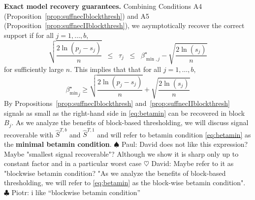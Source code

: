 \documentclass[aos]{imsart}
\theoremstyle{plain}
\newcommand{\david}[1]{{\small{\color{blue} \sf $\heartsuit$ David: #1}}}
\newcommand{\piotr}[1]{{\small{\color{red} \sf $\clubsuit$ Piotr: #1}}}
\newcommand{\paul}[1]{{\small{\color{green} \sf $\spadesuit$ Paul: #1}}}
\begin{document}
\noindent\textbf{Exact model recovery guarantees.} 
Combining Conditions A4 (Proposition~\ref{prop:suffnecIblockthresh}) and A5 (Proposition~\ref{prop:suffnecIIblockthresh}),
we asymptotically recover the correct support if for all $j=1,\ldots,b$,
\begin{equation}\label{eq:thetamin}
  \sqrt{\frac{2\ln(p_j-s_j)}{n}}\;\;\leq\;\;\tau_j\;\;\leq\;\;\beta_{\min,j}^{\star}-\sqrt{\frac{2\ln(s_j)}{n}}
\end{equation}
for sufficiently large $n$. This implies that %
that for all $j=1,\ldots,b$, %
\begin{equation}\label{eq:betamin}
    {\beta_{\min}^{\star}}_j \geq \sqrt{\frac{2\ln(p_j-s_j)}{n}} + \sqrt{\frac{2\ln(s_j)}{n}}
\end{equation}
By Propositions~\ref{prop:suffnecIblockthresh} and~\ref{prop:suffnecIIblockthresh} signals as small as the right-hand side in \eqref{eq:betamin} can be recovered in block $B_j$. As we analyze the benefits of block-based thresholding, %
we will discuss signal recoverable with $\hat{S}^{T,b}$ and $\hat{S}^{T,1}$ and will refer to betamin condition \eqref{eq:betamin} as the \textbf{minimal betamin condition}. \paul{David does not like this expression? Maybe "smallest signal recoverable"? Although we show it is sharp only up to constant factor and in a particular worst case} \david{Maybe refer to it as "blockwise betamin condition? "As we analyze the benefits of block-based thresholding, we will refer to \eqref{eq:betamin} as the block-wise betamin condition".}\piotr{i like ``blockwise betamin condition''}
\end{document}
